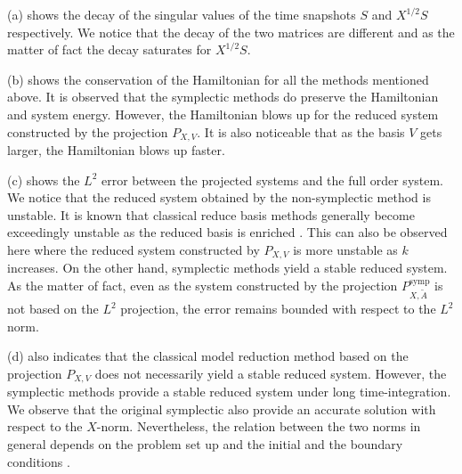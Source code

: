 (a) shows the decay of the singular values of the time snapshots $S$ and $X^{1/2}S$ respectively. We notice that the decay of the two matrices are different and as the matter of fact the decay saturates for $X^{1/2}S$.

(b) shows the conservation of the Hamiltonian for all the methods mentioned above. It is observed that the symplectic methods do preserve the Hamiltonian and system energy. However, the Hamiltonian blows up for the reduced system constructed by the projection $P_{X,V}$. It is also noticeable that as the basis $V$ gets larger, the Hamiltonian blows up faster.

(c) shows the $L^2$ error between the projected systems and the full order system. We notice that the reduced system obtained by the non-symplectic method is unstable. It is known that classical reduce basis methods generally become exceedingly unstable as the reduced basis is enriched . This can also be observed here where the reduced system constructed by $P_{X,V}$ is more unstable as $k$ increases. On the other hand, symplectic methods yield a stable reduced system. As the matter of fact, even as the system constructed by the projection $P^{\text{symp}}_{X,\tilde A}$ is not based on the $L^2$ projection, the error remains bounded with respect to the $L^2$ norm. 

(d) also indicates that the classical model reduction method based on the projection $P_{X,V}$ does not necessarily yield a stable reduced system. However, the symplectic methods provide a stable reduced system under long time-integration. We observe that the original symplectic also provide an accurate solution with respect to the $X$-norm. Nevertheless, the relation between the two norms in general depends on the problem set up and the initial and the boundary conditions \cite{DEPARIS20094359}.

